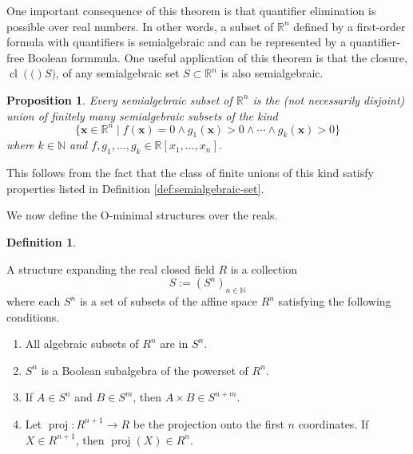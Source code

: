 \documentclass[
]{book}
\providecommand{\tightlist}{%
  \setlength{\itemsep}{0pt}\setlength{\parskip}{0pt}}
\newtheorem{proposition}{Proposition}[chapter]
\theoremstyle{definition}
\newtheorem{definition}{Definition}[chapter]
\theoremstyle{definition}
\theoremstyle{definition}
\theoremstyle{definition}
\theoremstyle{remark}
\begin{document}
One important consequence of this theorem is that quantifier elimination is possible over real numbers. In other words, a subset of \(\mathbb{R}^n\) defined by a first-order formula with quantifiers is semialgebraic and can be represented by a quantifier-free Boolean formmula. One useful application of this theorem is that the closure, \({\operatorname{cl} \left( ( \right)}S)\), of any semialgebraic set \(S \subset \mathbb{R}^n\) is also semialgebraic.

\begin{proposition}
\protect\hypertarget{prp:union-of-conjunctionss}{}\label{prp:union-of-conjunctionss}Every semialgebraic subset of \(\mathbb{R}^n\) is the (not necessarily disjoint) union of finitely many semialgebraic subsets of the kind
\[
\{ \mathbf{x} \in \mathbb{R}^n \mid f(\mathbf{x}) = 0 \land g_1(\mathbf{x}) > 0 \land \cdots \land g_k(\mathbf{x}) > 0 \}
\]
where \(k \in \mathbb{N}\) and \(f,g_1,\ldots,g_k \in \mathbb{R}[x_1,\ldots,x_n]\).
\end{proposition}

This follows from the fact that the class of finite unions of this kind satisfy properties listed in Definition \ref{def:semialgebraic-set}.

We now define the O-minimal structures over the reals.

\begin{definition}
\protect\hypertarget{def:definable-set}{}\label{def:definable-set}

A structure expanding the real closed field \(R\) is a collection \[
S := (S^n)_{n \in \mathbb{N}}
\]
where each \(S^n\) is a set of subsets of the affine space \(R^n\) satisfying the following conditions.

\begin{enumerate}
\def\labelenumi{\arabic{enumi}.}
\tightlist
\item
  All algebraic subsets of \(R^n\) are in \(S^n\).
\item
  \(S^n\) is a Boolean subalgebra of the powerset of \(R^n\).
\item
  If \(A \in S^n\) and \(B \in S^m\), then \(A \times B \in S^{n+m}\).
\item
  Let \(\operatorname{proj}: R^{n+1} \to R\) be the projection onto the first \(n\) coordinates. If \(X\in R^{n+1}\), then \(\operatorname{proj}(X) \in R^n\).
\end{enumerate}

\end{definition}
\end{document}

